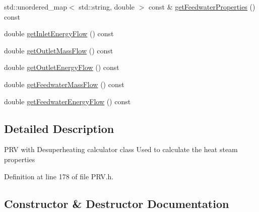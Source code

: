 \begin{DoxyCompactItemize}
\item 
std\+::unordered\+\_\+map$<$ std\+::string, double $>$ const  \& \hyperlink{class_prv_with_desuperheating_a5fbb776ba807118c8faaff03ba064a77}{get\+Feedwater\+Properties} () const
\item 
double \hyperlink{class_prv_with_desuperheating_a97e33f978d78c0e26d6b38a02d4b122b}{get\+Inlet\+Energy\+Flow} () const
\item 
double \hyperlink{class_prv_with_desuperheating_a848a898a392dd7abfb030d0ca1653454}{get\+Outlet\+Mass\+Flow} () const
\item 
double \hyperlink{class_prv_with_desuperheating_aa6e9bbb28c565ba8f7770f69ace33ab3}{get\+Outlet\+Energy\+Flow} () const
\item 
double \hyperlink{class_prv_with_desuperheating_a9bd8ee7d5b563110a7279102352b8f4d}{get\+Feedwater\+Mass\+Flow} () const
\item 
double \hyperlink{class_prv_with_desuperheating_a42945a77fcdbaf1e1844c444c696f8b0}{get\+Feedwater\+Energy\+Flow} () const
\end{DoxyCompactItemize}


\subsection{Detailed Description}
P\+RV with Desuperheating calculator class Used to calculate the heat steam properties 

Definition at line 178 of file P\+R\+V.\+h.



\subsection{Constructor \& Destructor Documentation}
\mbox{\label{class_prv_with_desuperheating_adfd7f6866e8b953dcc41e51bb5b31b58}} 
